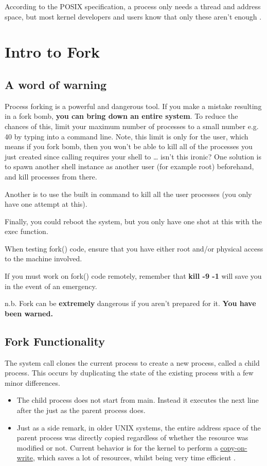 \begin{itemize}
According to the POSIX specification, a process only needs a thread and address space, but most kernel developers and users know that only these aren't enough \cite{process_def}.

\section{Intro to Fork}

\subsection{A word of warning}

Process forking is a powerful and dangerous tool.
If you make a mistake resulting in a fork bomb, \textbf{you can bring down an entire system}.
To reduce the chances of this, limit your maximum number of processes to a small number e.g. 40 by typing  into a command line.
Note, this limit is only for the user, which means if you fork bomb, then you won't be able to kill all of the processes you just created since calling  requires your shell to  \ldots{} isn't this ironic? One solution is to spawn another shell instance as another user (for example root) beforehand, and kill processes from there.

Another is to use the built in  command to kill all the user processes (you only have one attempt at this).

Finally, you could reboot the system, but you only have one shot at this with the exec function.

When testing fork() code, ensure that you have either root and/or physical access to the machine involved.

If you must work on fork() code remotely, remember that \textbf{kill -9 -1} will save you in the event of an emergency.

n.b. Fork can be \textbf{extremely} dangerous if you aren't prepared for it. \textbf{You have been warned.}

\subsection{Fork Functionality}

The  system call clones the current process to create a new process, called a child process.
This occurs by duplicating the state of the existing process with a few minor differences.
\begin{itemize}
    \item The child process does not start from main. Instead it executes the next line after the  just as the parent process does.
    \item Just as a side remark, in older UNIX systems, the entire address space of the parent process was directly copied regardless of whether the resource was modified or not. Current behavior is for the kernel to perform a \href{https://en.wikipedia.org/wiki/Copy-on-write}{copy-on-write}, which saves a lot of resources, whilst being very time efficient \cite[Copy-on-write section]{Bovet:2005:ULK:1077084}.
\end{itemize}


\end{itemize}
